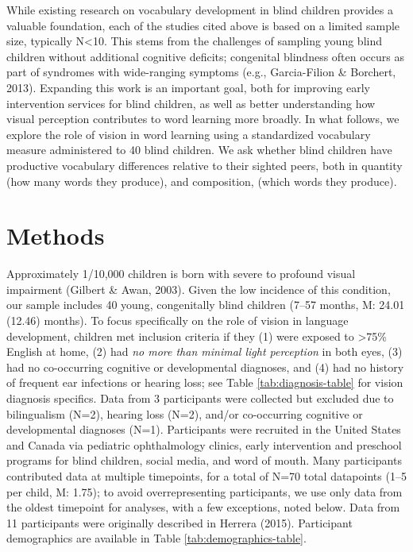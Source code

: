 \documentclass[english,man,floatsintext]{apa6}
\begin{document}
While existing research on vocabulary development in blind children provides a valuable foundation, each of the studies cited above is based on a limited sample size, typically N\textless{}10. This stems from the challenges of sampling young blind children without additional cognitive deficits; congenital blindness often occurs as part of syndromes with wide-ranging symptoms (e.g., Garcia-Filion \& Borchert, 2013). Expanding this work is an important goal, both for improving early intervention services for blind children, as well as better understanding how visual perception contributes to word learning more broadly. In what follows, we explore the role of vision in word learning using a standardized vocabulary measure administered to 40 blind children. We ask whether blind children have productive vocabulary differences relative to their sighted peers, both in quantity (how many words they produce), and composition, (which words they produce).

\hypertarget{methods}{%
\section{Methods}\label{methods}}

Approximately 1/10,000 children is born with severe to profound visual impairment (Gilbert \& Awan, 2003). Given the low incidence of this condition, our sample includes 40 young, congenitally blind children (7--57 months, M: 24.01 (12.46) months). To focus specifically on the role of vision in language development, children met inclusion criteria if they (1) were exposed to \textgreater{}75\% English at home, (2) had \emph{no more than minimal light perception} in both eyes, (3) had no co-occurring cognitive or developmental diagnoses, and (4) had no history of frequent ear infections or hearing loss; see Table \ref{tab:diagnosis-table} for vision diagnosis specifics. Data from 3 participants were collected but excluded due to bilingualism (N=2), hearing loss (N=2), and/or co-occurring cognitive or developmental diagnoses (N=1). Participants were recruited in the United States and Canada via pediatric ophthalmology clinics, early intervention and preschool programs for blind children, social media, and word of mouth. Many participants contributed data at multiple timepoints, for a total of N=70 total datapoints (1--5 per child, M: 1.75); to avoid overrepresenting participants, we use only data from the oldest timepoint for analyses, with a few exceptions, noted below. Data from 11 participants were originally described in Herrera (2015). Participant demographics are available in Table \ref{tab:demographics-table}.
\end{document}
